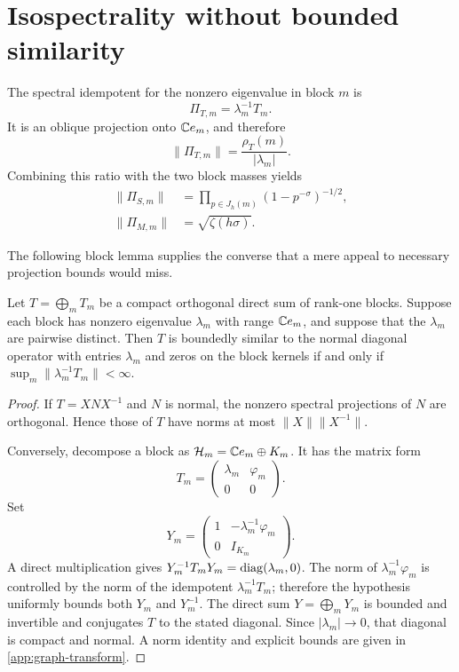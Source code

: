 \section{Isospectrality without bounded similarity}
\label{sec:similarity}

The spectral idempotent for the nonzero eigenvalue in block $m$ is
\begin{equation}
  \Pi_{T,m}=\lambda_m^{-1}T_m.
  \label{eq:riesz-block}
\end{equation}
It is an oblique projection onto $\mathbb C e_m$, and therefore
\begin{equation}
  \|\Pi_{T,m}\|=\frac{\rho_T(m)}{|\lambda_m|}.
  \label{eq:riesz-ratio}
\end{equation}
Combining this ratio with the two block masses yields
\begin{align}
  \|\Pi_{S,m}\|
    &=\prod_{p\in J_h(m)}(1-p^{-\sigma})^{-1/2},
      \label{eq:riesz-S}\\
  \|\Pi_{M,m}\|&=\sqrt{\zeta(h\sigma)}.
      \label{eq:riesz-M}
\end{align}

The following block lemma supplies the converse that a mere appeal to
necessary projection bounds would miss.

\begin{lemma}
\label{lem:uniform-diagonalization}
Let $T=\bigoplus_mT_m$ be a compact orthogonal direct sum of rank-one
blocks.  Suppose each block has nonzero eigenvalue $\lambda_m$ with range
$\mathbb C e_m$, and suppose that the $\lambda_m$ are pairwise distinct.  Then
$T$ is boundedly similar to the normal diagonal operator
with entries $\lambda_m$ and zeros on the block kernels if and only if
$\sup_m\|\lambda_m^{-1}T_m\|<\infty$.
\end{lemma}

\begin{proof}
If $T=XNX^{-1}$ and $N$ is normal, the nonzero spectral projections of
$N$ are orthogonal.  Hence those of $T$ have norms at most
$\|X\|\|X^{-1}\|$.

Conversely, decompose a block as
$\mathcal H_m=\mathbb C e_m\oplus K_m$.  It has the matrix form
\[
  T_m=\begin{pmatrix}\lambda_m&\varphi_m\\0&0\end{pmatrix}.
\]
Set
\[
  Y_m=\begin{pmatrix}1&-\lambda_m^{-1}\varphi_m\\0&I_{K_m}\end{pmatrix}.
\]
A direct multiplication gives
$Y_m^{-1}T_mY_m=\operatorname{diag}(\lambda_m,0)$.  The norm of
$\lambda_m^{-1}\varphi_m$ is controlled by the norm of the idempotent
$\lambda_m^{-1}T_m$; therefore the hypothesis uniformly bounds both
$Y_m$ and $Y_m^{-1}$.  The direct sum $Y=\bigoplus_mY_m$ is bounded and
invertible and conjugates $T$ to the stated diagonal.  Since
$|\lambda_m|\to0$, that diagonal is compact and normal.  A norm identity
and explicit bounds are given in \cref{app:graph-transform}.
\end{proof}

